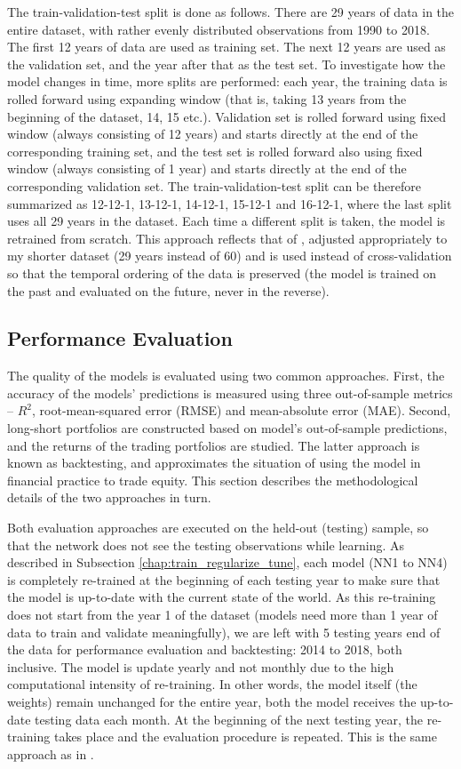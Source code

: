 		The train-validation-test split is done as follows. There are 29 years of data in the entire dataset, with rather evenly distributed observations from 1990 to 2018. The first 12 years of data are used as training set. The next 12 years are used as the validation set, and the year after that as the test set. To investigate how the model changes in time, more splits are performed: each year, the training data is rolled forward using expanding window (that is, taking 13 years from the beginning of the dataset, 14, 15 etc.). Validation set is rolled forward using fixed window (always consisting of 12 years) and starts directly at the end of the corresponding training set, and the test set is rolled forward also using fixed window (always consisting of 1 year) and starts directly at the end of the corresponding validation set. The train-validation-test split can be therefore summarized as 12-12-1, 13-12-1, 14-12-1, 15-12-1 and 16-12-1, where the last split uses all 29 years in the dataset. Each time a different split is taken, the model is retrained from scratch. This approach reflects that of \cite{gu2020empirical}, adjusted appropriately to my shorter dataset (29 years instead of 60) and is used instead of cross-validation so that the temporal ordering of the data is preserved (the model is trained on the past and evaluated on the future, never in the reverse).    


	\subsection{Performance Evaluation}
		The quality of the models is evaluated using two common approaches. First, the accuracy of the models' predictions is measured using three out-of-sample metrics – $R^2$, root-mean-squared error (RMSE) and mean-absolute error (MAE). Second, long-short portfolios are constructed based on model's out-of-sample predictions, and the returns of the trading portfolios are studied. The latter approach is known as backtesting, and approximates the situation of using the model in financial practice to trade equity. This section describes the methodological details of the two approaches in turn. 
		
		Both evaluation approaches are executed on the held-out (testing) sample, so that the network does not see the testing observations while learning. As described in Subsection \ref{chap:train_regularize_tune}, each model (NN1 to NN4) is completely re-trained at the beginning of each testing year to make sure that the model is up-to-date with the current state of the world. As this re-training does not start from the year 1 of the dataset (models need more than 1 year of data to train and validate meaningfully), we are left with 5 testing years end of the data for performance evaluation and backtesting: 2014 to 2018, both inclusive. The model is update yearly and not monthly due to the high computational intensity of re-training. In other words, the model itself (the weights) remain unchanged for the entire year, both the model receives the up-to-date testing data each month. At the beginning of the next testing year, the re-training takes place and the evaluation procedure is repeated. This is the same approach as in \cite{gu2020empirical, tobek2020does}.
		
